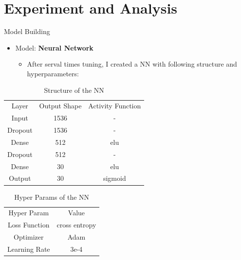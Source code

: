 \documentclass[
 size=12pt,
 paper=smartboard, %
 mode=present, %
 display=slides, %
style=tuliplab,
pauseslide,
fleqn,leqno]{powerdot}
\begin{document}
\section{Experiment and Analysis}
\begin{slide}{Model Building}
    \begin{itemize}
        \item Model: \textbf{Neural Network}
        \begin{itemize}
            \item After serval times tuning, I created a NN with following structure and hyperparameters:
        \end{itemize}
    \end{itemize}
    \begin{table}
        \centering
        \caption{Structure of the NN}
        \label{tbl:NN1}
        \begin{tabular}{ccc}
            \hline
            Layer & Output Shape & Activity Function \\
            Input & 1536 & -      \\
            Dropout & 1536 & -    \\
            Dense & 512 & elu     \\
            Dropout & 512 & -     \\
            Dense & 30 & elu      \\
            Output & 30 & sigmoid \\ 
        \end{tabular}
    \end{table}
    \begin{table}
        \centering
        \caption{Hyper Params of the NN}
        \label{tbl:NN2}
        \begin{tabular}{cc}
            \hline
            Hyper Param & Value   \\
            Loss Function & cross entropy &\\
            Optimizer & Adam \\
            Learning Rate & 3e-4 \\
         \end{tabular}
    \end{table}
\end{slide}
%
%    
\end{document}

